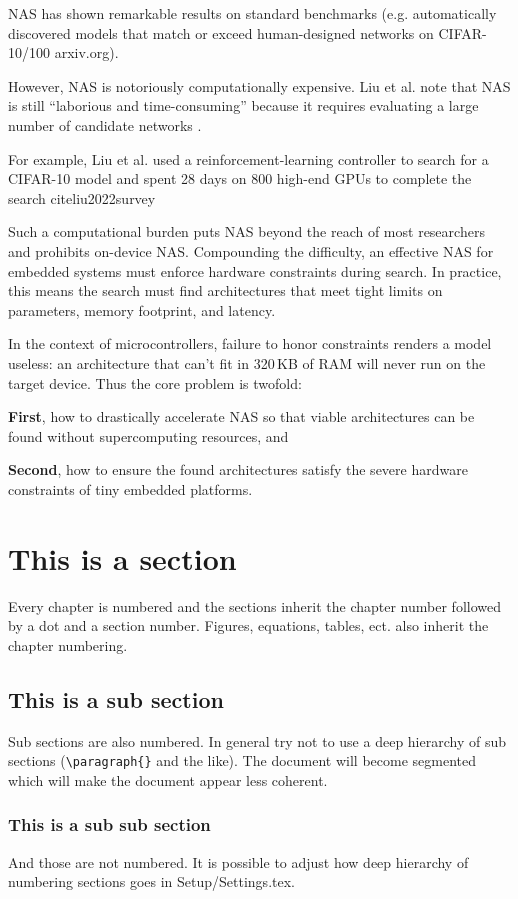 NAS has shown remarkable results on standard benchmarks (e.g. automatically discovered models that match or exceed human-designed networks on CIFAR-10/100 arxiv.org).

However, NAS is notoriously computationally expensive. Liu et al. note that NAS is still “laborious and time-consuming” because it requires evaluating a large number of candidate networks \cite{liu2022survey} .

For example, Liu et al. used a reinforcement-learning controller to search for a CIFAR-10 model and spent 28 days on 800 high-end GPUs to complete the search
cite{liu2022survey} 

Such a computational burden puts NAS beyond the reach of most researchers and prohibits on-device NAS. Compounding the difficulty, an effective NAS for embedded systems must enforce hardware constraints during search. In practice, this means the search must find architectures that meet tight limits on parameters, memory footprint, and latency.

In the context of microcontrollers, failure to honor constraints renders a model useless: an architecture that can’t fit in 320 KB of RAM will never run on the target device. Thus the core problem is twofold: 

\textbf{First}, how to drastically accelerate NAS so that viable architectures can be found without supercomputing resources, and

\textbf{Second}, how to ensure the found architectures satisfy the severe hardware constraints of tiny embedded platforms.

\section{This is a section}
Every chapter is numbered and the sections inherit the chapter number followed by a dot and a section number. Figures, equations, tables, ect. also inherit the chapter numbering. 

\subsection{This is a sub section}
Sub sections are also numbered. In general try not to use a deep hierarchy of sub sections (\texttt{\textbackslash paragraph\{\}} and the like). The document will become segmented which will make the document appear less coherent. 

\subsubsection{This is a sub sub section}
And those are not numbered. It is possible to adjust how deep hierarchy of numbering sections goes in Setup/Settings.tex. 

